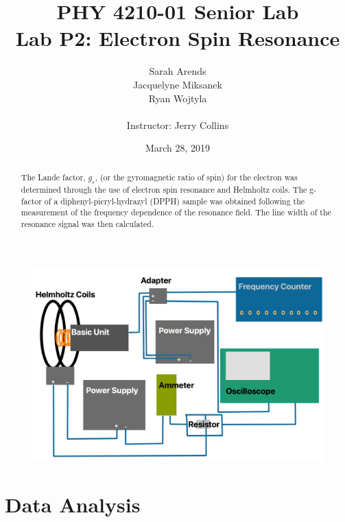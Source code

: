 \documentclass[a4paper]{article}
\title{PHY 4210-01 Senior Lab \\Lab P2: Electron Spin Resonance}
\author{Sarah Arends \\
        Jacquelyne Miksanek \\
        Ryan Wojtyla \\ \\
        Instructor: Jerry Collins}
\date{March 28, 2019}
\begin{document}
\maketitle

\begin{abstract}

\qq The Lande factor, $g_s$, (or the gyromagnetic ratio of spin) for the
electron was determined through the use of electron spin resonance and
Helmholtz coils. The g-factor of a diphenyl-picryl-hydrazyl (DPPH) sample was
obtained following the measurement of the frequency dependence of the
resonance field. The line width of the resonance signal was then calculated.

\end{abstract}

\newpage

\tableofcontents

\newpage

\begin{figure}[H]
\centering
\includegraphics[width=1\textwidth]{Circuit_Diagram_P2Lab.png}
\label{Circuit_Diagram}
\end{figure}

\section{Data Analysis}
\end{document}
